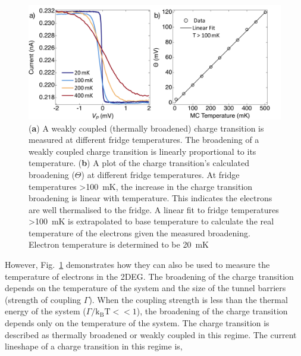 \begin{figure}[!htb]
 \begin{center}
 \includegraphics[width=1.0\textwidth]{figures/ch1/figure7.pdf}
 \caption[Determining Electron Temperature]{\label{fig:ch1/electron_temp} 
 (\textbf{a}) A weakly coupled (thermally broadened) charge transition is measured at different fridge temperatures. The broadening of a weakly coupled charge transition is linearly proportional to its temperature. (\textbf{b}) A plot of the charge transition's calculated broadening ($\Theta$) at different fridge temperatures. At fridge temperatures \qty{>100}{mK}, the increase in the charge transition broadening is linear with temperature. This indicates the electrons are well thermalised to the fridge. A linear fit to fridge temperatures \qty{>100}{mK} is extrapolated to base temperature to calculate the real temperature of the electrons given the measured broadening. Electron temperature is determined to be \qty{20}{mK}
 }
 \end{center}
\end{figure}



However, Fig.~\ref{fig:ch1/electron_temp} demonstrates how they can also be used to measure the temperature of electrons in the 2DEG. The broadening of the charge transition depends on the temperature of the system and the size of the tunnel barriers (strength of coupling $\Gamma$). When the coupling strength is less than the thermal energy of the system ($\Gamma/\mathrm{k_BT} << 1$), the broadening of the charge transition depends only on the temperature of the system. The charge transition is described as thermally broadened or weakly coupled in this regime. The current lineshape of a charge transition in this regime is,


